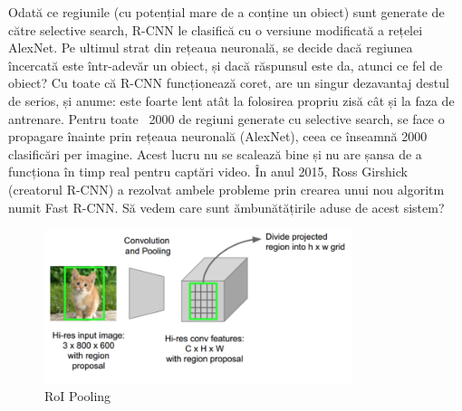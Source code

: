 Odată ce regiunile (cu potențial mare de a conține un obiect) sunt generate de către selective search, R-CNN le clasifică cu o versiune modificată a rețelei AlexNet. Pe ultimul strat din rețeaua neuronală, se decide dacă regiunea încercată este într-adevăr un obiect, și dacă răspunsul este da, atunci ce fel de obiect?\newline
Cu toate că R-CNN funcționează coret, are un singur dezavantaj destul de serios, și anume: este foarte lent atât la folosirea propriu zisă cât și la faza de antrenare. Pentru toate ~2000 de regiuni generate cu selective search, se face o propagare înainte prin rețeaua neuronală (AlexNet), ceea ce înseamnă 2000 clasificări per imagine. Acest lucru nu se scalează bine și nu are șansa de a funcționa în timp real pentru captări video.\newline
În anul 2015, Ross Girshick (creatorul R-CNN) a rezolvat ambele probleme prin crearea unui nou algoritm numit Fast R-CNN. Să vedem care sunt ămbunătățirile aduse de acest sistem?
\begin{figure}[h!]
    	\centering
	\captionsetup{justification=centering, margin=2cm}
	\includegraphics[width=0.8\textwidth]{figures/fast_rcnn.png}
	\caption{RoI Pooling \cite{historyCNN}}
	\label{fig:roi_pooling}
\end{figure}

